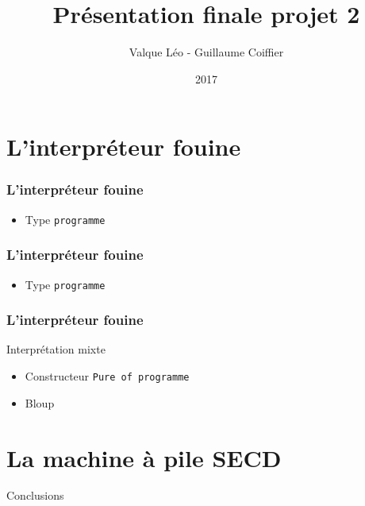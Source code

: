 \documentclass[xcolor=dvipsnames]{beamer}
\title{Présentation finale projet 2}
\author{Valque Léo - Guillaume Coiffier}
\institute{ENS de Lyon}
\date{2017}
\begin{document}
\maketitle

\section{L'interpréteur fouine}

\begin{frame}
\frametitle{L'interpréteur fouine}
  \begin{itemize}
   \item Type \texttt{programme}
  \end{itemize}
\end{frame}

\begin{frame}
\frametitle{L'interpréteur fouine}
  \begin{itemize}
   \item Type \texttt{programme}
  \end{itemize}
\end{frame}

\begin{frame}
\frametitle{L'interpréteur fouine}
  Interprétation mixte
 \begin{itemize}
   \item Constructeur \texttt{Pure of programme}
   \item Bloup
  \end{itemize}
\end{frame}

\section{La machine à pile SECD}


\begin{frame}{Conclusions}

  
\end{frame}
\end{document}
